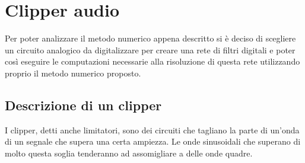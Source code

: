 \chapter{Clipper audio}
	Per poter analizzare il metodo numerico appena descritto si è deciso di scegliere un circuito analogico da digitalizzare per creare una rete di filtri digitali e poter così eseguire le computazioni necessarie alla risoluzione di questa rete utilizzando proprio il metodo numerico proposto.
	
	\section{Descrizione di un clipper}
		I clipper, detti anche limitatori, sono dei circuiti che tagliano la parte di un'onda di un segnale che supera una certa ampiezza. Le onde sinusoidali che superano di molto questa soglia tenderanno ad assomigliare a delle onde quadre.
		
